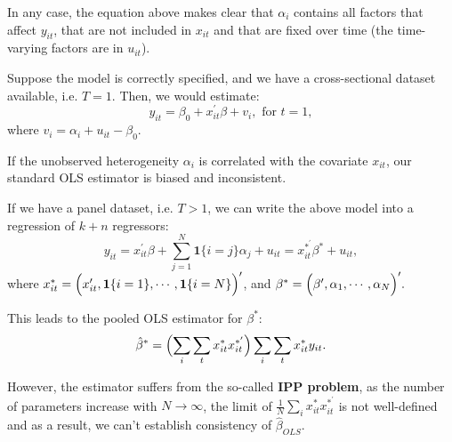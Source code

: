 In any case, the equation above makes clear that $\alpha_i $ contains all factors that affect $y_{it}$, that are
not included in $x_{it}$ and that are ﬁxed over time (the time-varying factors are in $u_{it}$).

Suppose the model is correctly specified, and we have a cross-sectional dataset available, i.e. $T=1$.
Then, we would estimate:
\[y_{it} = \beta_0 + x_{it}^{\prime} \beta + v_i, \text{ for } t=1,\]
where $v_i = \alpha_i + u_{it} -\beta_0.$

If the unobserved heterogeneity $\alpha_i$ is correlated with the covariate $x_{it} $,
our standard OLS estimator is biased and inconsistent.

If we have a panel dataset, i.e. $T>1$, we can write the above model into a regression of $k+n$ regressors:
\[
y_{it} = x_{it}^{\prime} \beta + \sum_{j=1}^{N}\mathbf{1}\{i=j\} \alpha_j + u_{it} = x_{it}^{*^{\prime}} \beta^* + u_{it},
\]
where $x_{it}^* = \Bigl( x_{it}^{\prime}, \mathbf{1}\{i=1\}, \cdots, \mathbf{1}\{i=N\} \Bigr)^{\prime} $,
and $\beta^* = \Bigl( \beta^{\prime}, \alpha_1, \cdots, \alpha_N \Bigr)^{\prime}.$

This leads to the pooled OLS estimator for $\beta^*$:
\[
\hat{\beta}^* = \Bigl( \sum_i \sum_t x_{it}^* x_{it}^{*^{\prime}} \Bigr) \sum_i \sum_t x_{it}^* y_{it}. 
\]

However, the estimator suffers from the so-called \textbf{IPP problem}, 
as the number of parameters increase with $N \rightarrow\infty $, 
the limit of $\frac{1}{N} \sum_i x_{it}^* x_{it}^{*^{\prime}}$ is not well-defined
and as a result, we can't establish consistency of $\hat{\beta}_{OLS}.$